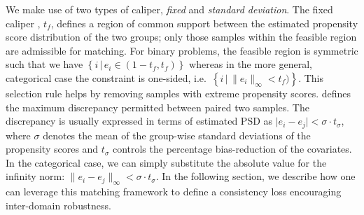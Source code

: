 We make use of two types of caliper, \emph{fixed} and \emph{standard deviation}. The fixed caliper
\citep{crump2009dealing}, $t_f$, defines a region of common support between the estimated
propensity score distribution of the two groups; only those samples within the feasible region are
admissible for matching. For binary problems, the feasible region is symmetric such that we have \(
\left\{i \, | \, e_i \in (1 - t_{f}, t_{f}) \right\} \) whereas in the more general, categorical
case the constraint is one-sided, i.e.\ \( \left\{i \, | \, \lVert e_i \rVert_{\infty} < t_{f})
\right\} \).
%
This selection rule helps by removing samples with extreme propensity scores.
%
\citet{rosenbaum1985constructing} defines the maximum discrepancy permitted between paired two samples.
%
The discrepancy is usually expressed in terms of estimated PSD as \( \vert e_i - e_j \vert < \sigma
\cdot t_\sigma \), where \(\sigma\) denotes the mean of the group-wise standard deviations of the
propensity scores and \(t_\sigma\) controls the percentage bias-reduction of the
covariates. 
%
In the categorical case, we can simply substitute the absolute value for the infinity norm: \(
\lVert e_i - e_j \rVert_\infty < \sigma \cdot t_\sigma \).
%
In the following section, we describe how one can leverage this matching framework to define a
consistency loss encouraging inter-domain robustness.
